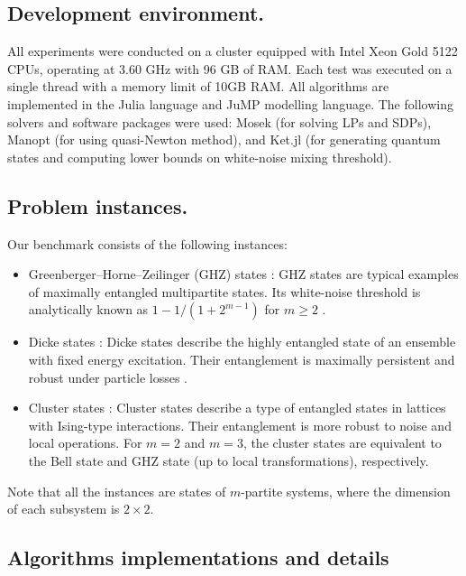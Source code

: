 \documentclass[smallextended]{svjour3}
\newcommand{\1}{\mathbf{1}}
\begin{document}
\subsection{Development environment.}
All experiments were conducted on a cluster equipped with Intel Xeon Gold 5122 CPUs, operating at 3.60 GHz with 96 GB of RAM. Each test was executed on a single thread with a memory limit of 10GB RAM. All algorithms are implemented in the Julia language and JuMP modelling language. The following solvers and software packages were used: Mosek (for solving LPs and SDPs), Manopt \cite{bergmann2022manopt} (for using quasi-Newton method), and Ket.jl \cite{araujo_2025_15837771} (for generating quantum states and computing lower bounds on white-noise mixing
threshold).


\subsection{Problem instances.}
 Our benchmark consists of the following instances:
\begin{itemize}
    \item Greenberger–Horne–Zeilinger (GHZ) states \cite{greenberger1990bell}: GHZ states are typical examples of maximally entangled multipartite  states. Its white-noise threshold is analytically known as $1 - 1 / (1 + 2^{m-1})$ for $m\ge 2$ \cite{Dur2000classification}.
    \item Dicke states \cite{Dicke1954coherence}: Dicke states describe the highly entangled state of an ensemble with fixed energy excitation.
    Their entanglement is maximally persistent and robust under particle losses \cite{Guhne2008multiparticle}.
        \item Cluster states  \cite{Briegel2001persistent}: Cluster states describe a type of entangled states in lattices with Ising-type interactions. Their entanglement is more robust to noise and local operations. For $m=2$ and $m=3$, the cluster states are equivalent to the Bell state and GHZ state (up to local transformations), respectively.
\end{itemize}
Note that all the instances are states of $m$-partite systems, where the dimension of each subsystem is $2 \times 2$.

\subsection{Algorithms implementations and details}
\label{sec.implem}
\end{document}
